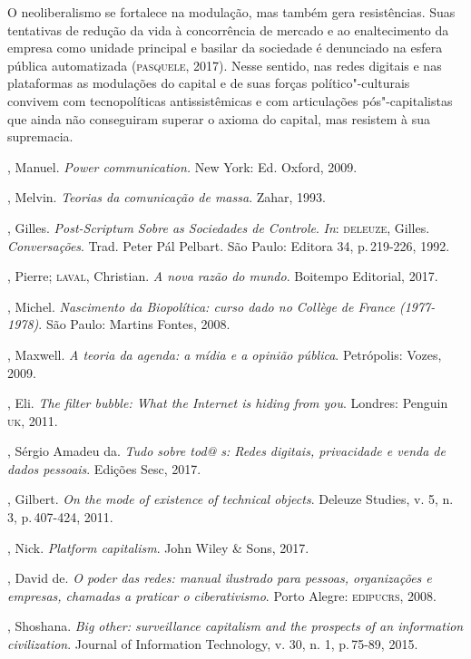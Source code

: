 O neoliberalismo se fortalece na modulação, mas também gera
resistências. Suas tentativas de redução da vida à concorrência de
mercado e ao enaltecimento da empresa como unidade principal e basilar
da sociedade é denunciado na esfera pública automatizada (\textsc{pasquele},
2017). Nesse sentido, nas redes digitais e nas plataformas as modulações
do capital e de suas forças político"-culturais convivem com
tecnopolíticas antissistêmicas e com articulações pós"-capitalistas que
ainda não conseguiram superar o axioma do capital, mas resistem à sua
supremacia.

\begin{bibliohedra}
, Manuel. \emph{Power communication.} New York: Ed. Oxford,
2009.

, Melvin. \emph{Teorias da comunicação de massa}. Zahar, 1993.

, Gilles. \emph{Post-Scriptum Sobre as Sociedades de Controle}. \emph{In}:
\textsc{deleuze}, Gilles. \emph{Conversações}. Trad. Peter Pál Pelbart. São Paulo:
Editora 34, p.\,219-226, 1992.

, Pierre; \textsc{laval}, Christian. \emph{A nova razão do mundo}.
Boitempo Editorial, 2017.

, Michel. \emph{Nascimento da Biopolítica: curso dado no
Collège de France (1977-1978)}. São Paulo: Martins Fontes, 2008.

, Maxwell. \emph{A teoria da agenda: a mídia e a opinião
pública}. Petrópolis: Vozes, 2009.

, Eli. \emph{The filter bubble: What the Internet is hiding
from you}. Londres: Penguin \textsc{uk}, 2011.

, Sérgio Amadeu da. \emph{Tudo sobre tod@ s: Redes digitais,
privacidade e venda de dados pessoais}. Edições Sesc, 2017.

, Gilbert. \emph{On the mode of existence of technical
objects}. Deleuze Studies, v. 5, n. 3, p.\,407-424, 2011.

, Nick. \emph{Platform capitalism}. John Wiley \& Sons, 2017.

, David de. \emph{O poder das redes: manual ilustrado para
pessoas, organizações e empresas, chamadas a praticar o ciberativismo}.
Porto Alegre: \textsc{edipucrs}, 2008.

, Shoshana. \emph{Big other: surveillance capitalism and the
prospects of an information civilization}. Journal of Information
Technology, v. 30, n. 1, p.\,75-89, 2015.\\
\end{bibliohedra}

